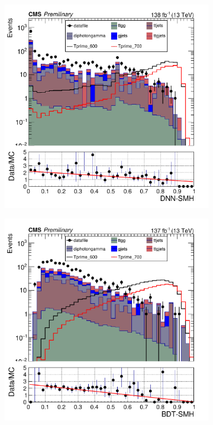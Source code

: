 \begin{figure}[H]
     \centering
     \begin{subfigure}[b]{0.45\textwidth}
         \centering
         \includegraphics[width=\textwidth]{figure_4/Stacked_plot_DNN_600-700_with_diphoton_cuts.pdf}
         \label{fig:y equals x}
     \end{subfigure}
     \hfill
     \begin{subfigure}[b]{0.45\textwidth}
         \centering
         \includegraphics[width=\textwidth ]{BDT_Output/Stacked_plot_BDT_600-700_with_diphoton_cuts_inputs.pdf}

\end{subfigure}
\end{figure}
